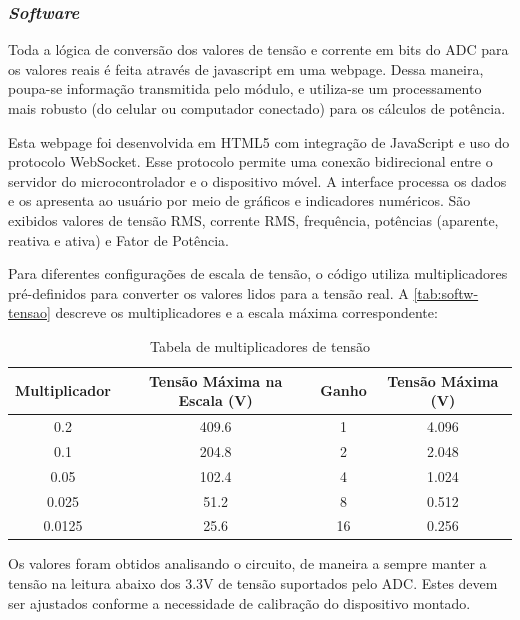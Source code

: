 \subsubsection{\textit{Software}}\label{softwa}

Toda a lógica de conversão dos valores de tensão e corrente em bits do \gls{ADC} para os valores reais é feita através de javascript em uma webpage. Dessa maneira, poupa-se informação transmitida pelo módulo, e utiliza-se um processamento mais robusto (do celular ou computador conectado) para os cálculos de potência.

Esta webpage foi desenvolvida em HTML5 com integração de JavaScript e uso do protocolo WebSocket. Esse protocolo permite uma conexão bidirecional entre o servidor do microcontrolador e o dispositivo móvel. A interface processa os dados e os apresenta ao usuário por meio de gráficos e indicadores numéricos. São exibidos valores de tensão RMS, corrente RMS, frequência, potências (aparente, reativa e ativa) e Fator de Potência.

Para diferentes configurações de escala de tensão, o código utiliza multiplicadores pré-definidos para converter os valores lidos para a tensão real. A \autoref{tab:softw-tensao} descreve os multiplicadores e a escala máxima correspondente:

\begin{table}[h!]
    \centering
    \caption{Tabela de multiplicadores de tensão}
    \vspace*{5mm}
    \begin{tabular}{ c c c c }
        \hline
        \textbf{Multiplicador} & \textbf{Tensão Máxima na Escala (V)} & \textbf{Ganho} & \textbf{Tensão Máxima (V)} \\
        \hline
        0.2 & 409.6 & 1 & 4.096 \\
        0.1 & 204.8 & 2 & 2.048 \\
        0.05 & 102.4 & 4 & 1.024 \\
        0.025 & 51.2 & 8 & 0.512 \\
        0.0125 & 25.6 & 16 & 0.256 \\
        \hline
    \end{tabular}
    \label{tab:softw-tensao}
    \fonte{}
\end{table}

Os valores foram obtidos analisando o circuito, de maneira a sempre manter a tensão na leitura abaixo dos 3.3V de tensão suportados pelo \gls{ADC}. Estes devem ser ajustados conforme a necessidade de calibração do dispositivo montado.

